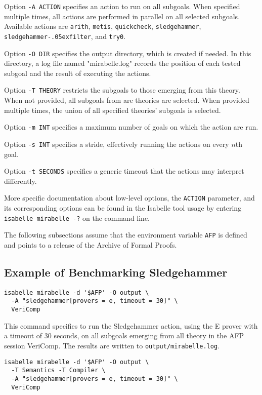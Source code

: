 \documentclass[a4paper,12pt]{article}
\renewcommand\_{\hbox{\textunderscore\kern-.05ex}}
\begin{document}
Option \texttt{-A ACTION} specifies an action to run on all subgoals. When
specified multiple times, all actions are performed in parallel on all
selected subgoals. Available actions are \texttt{arith}, \texttt{metis},
\texttt{quickcheck}, \texttt{sledgehammer}, \texttt{sledgehammer\_filter}, and
\texttt{try0}.

Option \texttt{-O DIR} specifies the output directory, which is created
if needed. In this directory, a log file named "mirabelle.log" records the
position of each tested subgoal and the result of executing the actions.

Option \texttt{-T THEORY} restricts the subgoals to those emerging from this
theory. When not provided, all subgoals from are theories are selected. When
provided multiple times, the union of all specified theories' subgoals is
selected.

Option \texttt{-m INT} specifies a maximum number of goals on which the action
are run.

Option \texttt{-s INT} specifies a stride, effectively running the actions on
every $n$th goal.

Option \texttt{-t SECONDS} specifies a generic timeout that the actions may
interpret differently.

More specific documentation about low-level options, the \texttt{ACTION}
parameter, and its corresponding options can be found in the Isabelle tool
usage by entering \texttt{isabelle mirabelle -?} on the command line.

The following subsections assume that the environment variable \texttt{AFP} is
defined and points to a release of the Archive of Formal Proofs.


\subsection{Example of Benchmarking Sledgehammer}

\begin{verbatim}
isabelle mirabelle -d '$AFP' -O output \
  -A "sledgehammer[provers = e, timeout = 30]" \
  VeriComp
\end{verbatim}

This command specifies to run the Sledgehammer action, using the E prover with
a timeout of 30 seconds, on all subgoals emerging from all theory in the AFP
session VeriComp. The results are written to \texttt{output/mirabelle.log}.

\begin{verbatim}
isabelle mirabelle -d '$AFP' -O output \
  -T Semantics -T Compiler \
  -A "sledgehammer[provers = e, timeout = 30]" \
  VeriComp
\end{verbatim}
\end{document}

